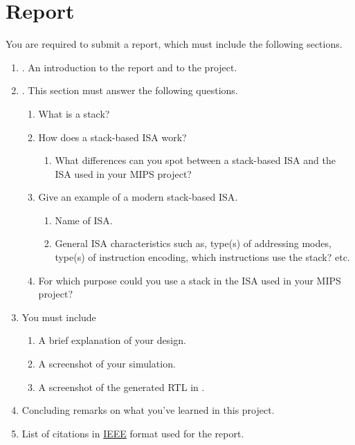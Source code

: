 \documentclass[number=03]{assignment}
\begin{document}
\section{Report}\label{sec:Report}
You are required to submit a report, which must include the following sections.

\begin{enumerate}
  \item {}. An introduction to the report and to the project.
  \item {}. This section must answer the following questions.
  \begin{enumerate}
    \item What is a stack?
    \item How does a stack-based \ac{ISA} work?
    \begin{enumerate}
    \item What differences can you spot between a stack-based \ac{ISA} and the \ac{ISA} used in your \ac{MIPS} project?
    \end{enumerate}
    \item Give an example of a modern stack-based \ac{ISA}.
    \begin{enumerate}
    \item Name of \ac{ISA}.
    \item General \ac{ISA} characteristics such as, type(s) of addressing modes, type(s) of instruction encoding, which instructions use the stack? etc.
    \end{enumerate}
    \item For which purpose could you use a stack in the \ac{ISA} used in your \ac{MIPS} project? 
  \end{enumerate}
  \item {} You must include
  \begin{enumerate}
  \item A brief explanation of your \SV design.
  \item A screenshot of your \ModelSim simulation.
  \item A screenshot of the generated \ac{RTL} in \Quartus.
  \end{enumerate}
  \item {} Concluding remarks on what you've learned in this project.
  \item {} List of citations in \href{http://journals.ieeeauthorcenter.ieee.org/wp-content/uploads/sites/7/IEEE-Reference-Guide.pdf}{IEEE} format used for the report.
\end{enumerate}
\end{document}
